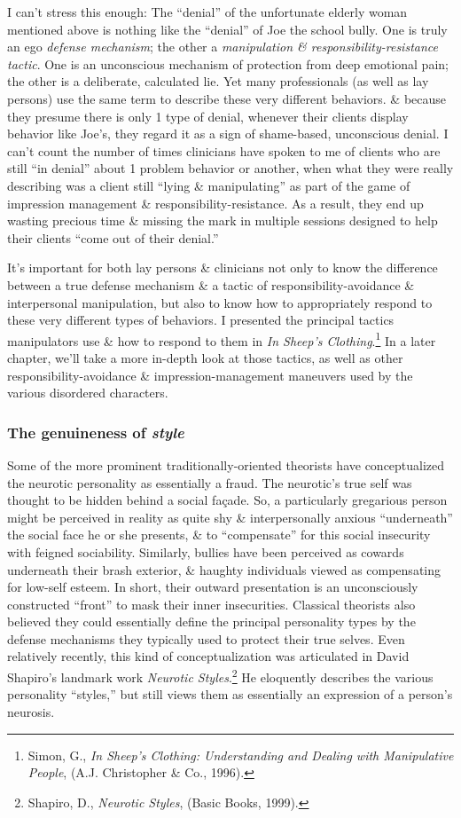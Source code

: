 \documentclass{article}
\numberwithin{equation}{section}
\begin{document}
I can't stress this enough: The ``denial'' of the unfortunate elderly woman mentioned above is nothing like the ``denial'' of Joe the school bully. One is truly an ego \textit{defense mechanism}; the other a \textit{manipulation \& responsibility-resistance tactic}. One is an unconscious mechanism of protection from deep emotional pain; the other is a deliberate, calculated lie. Yet many professionals (as well as lay persons) use the same term to describe these very different behaviors. \& because they presume there is only 1 type of denial, whenever their clients display behavior like Joe's, they regard it as a sign of shame-based, unconscious denial. I can't count the number of times clinicians have spoken to me of clients who are still ``in denial'' about 1 problem behavior or another, when what they were really describing was a client still ``lying \& manipulating'' as part of the game of impression management \& responsibility-resistance. As a result, they end up wasting precious time \& missing the mark in multiple sessions designed to help their clients ``come out of their denial.''

It's important for both lay persons \& clinicians not only to know the difference between a true defense mechanism \& a tactic of responsibility-avoidance \& interpersonal manipulation, but also to know how to appropriately respond to these very different types of behaviors. I presented the principal tactics manipulators use \& how to respond to them in \textit{In Sheep's Clothing}.\footnote{Simon, G., \textit{In Sheep's Clothing: Understanding and Dealing with Manipulative People}, (A.J. Christopher \& Co., 1996).} In a later chapter, we'll take a more in-depth look at those tactics, as well as other responsibility-avoidance \& impression-management maneuvers used by the various disordered characters.

\subsubsection{The genuineness of \textit{style}}
Some of the more prominent traditionally-oriented theorists have conceptualized the neurotic personality as essentially a fraud. The neurotic's true self was thought to be hidden behind a social fa\c{c}ade. So, a particularly gregarious person might be perceived in reality as quite shy \& interpersonally anxious ``underneath'' the social face he or she presents, \& to ``compensate'' for this social insecurity with feigned sociability. Similarly, bullies have been perceived as cowards underneath their brash exterior, \& haughty individuals viewed as compensating for low-self esteem. In short, their outward presentation is an unconsciously constructed ``front'' to mask their inner insecurities. Classical theorists also believed they could essentially define the principal personality types by the defense mechanisms they typically used to protect their true selves. Even relatively recently, this kind of conceptualization was articulated in David Shapiro's landmark work \textit{Neurotic Styles}.\footnote{Shapiro, D., \textit{Neurotic Styles}, (Basic Books, 1999).} He eloquently describes the various personality ``styles,'' but still views them as essentially an expression of a person's neurosis.
\end{document}
